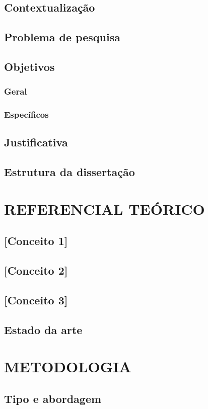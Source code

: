 \documentclass[
    12pt,
    openright,
    twoside,
    a4paper,
    chapter=TITLE,
    sumario=tradicional,
    section=TITLE,
    english,
    brazil
]{abntex2}
\begin{document}
\section{Contextualização}
\section{Problema de pesquisa}
\section{Objetivos}
\subsection{Geral}
\subsection{Específicos}
\section{Justificativa}
\section{Estrutura da dissertação}

\chapter{REFERENCIAL TEÓRICO}
\section{[Conceito 1]}
\section{[Conceito 2]}
\section{[Conceito 3]}
\section{Estado da arte}

\chapter{METODOLOGIA}
\section{Tipo e abordagem}
\end{document}
